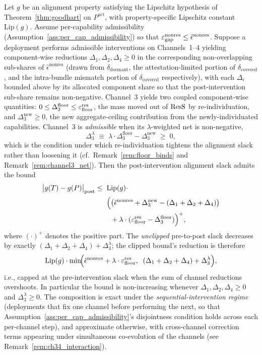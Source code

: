 \begin{proposition}
\label{prop:channel_composition}
Let $g$ be an alignment property satisfying the Lipschitz
hypothesis of Theorem~\ref{thm:goodhart} on
$P^{\mathrm{act}}$, with property-specific Lipschitz constant
$\mathrm{Lip}(g)$.  Assume per-capability admissibility
(Assumption~\ref{ass:per_cap_admissibility}) so that
$\varepsilon_{\mathrm{gap}}^{\mathrm{nonres}} \leq \hat{\epsilon}^{\mathrm{nonres}}$.  Suppose a
deployment performs admissible interventions on Channels~1--4
yielding component-wise reductions $\Delta_1, \Delta_2, \Delta_4
\geq 0$ in the corresponding non-overlapping sub-shares of
$\hat{\epsilon}^{\mathrm{nonres}}$ (drawn from
$\delta_{\mathrm{dormant}}$, the attestation-limited portion of
$\delta_{\mathrm{covered}}$, and the intra-bundle mismatch
portion of $\delta_{\mathrm{covered}}$ respectively), with each
$\Delta_i$ bounded above by its allocated component share so
that the post-intervention sub-share remains non-negative.
Channel~3 yields two coupled component-wise quantities:
$0 \leq \Delta_3^{\mathrm{floor}} \leq \varepsilon_{\mathrm{floor}}^{\mathrm{res}}$, the mass
moved out of $\mathrm{ResS}$ by re-individuation, and
$\Delta_3^{\mathrm{new}} \geq 0$, the new aggregate-ceiling
contribution from the newly-individuated capabilities.  Channel~3 is \emph{admissible} when its
$\lambda$-weighted net is non-negative,
\[
  \Delta_3^{\lambda}
  \;\equiv\; \lambda \cdot \Delta_3^{\mathrm{floor}}
              - \Delta_3^{\mathrm{new}}
  \;\geq\; 0,
\]
which is the condition under which re-individuation tightens the
alignment slack rather than loosening it (cf.\
Remark~\ref{rem:floor_binds} and
Remark~\ref{rem:channel3_net}).  Then the post-intervention
alignment slack admits the bound
\begin{align*}
  \bigl| g(T) - g(P) \bigr|_{\mathrm{post}}
  \leq\;\;& \mathrm{Lip}(g) \cdot \\
  & \Bigl(
    \bigl(\hat{\epsilon}^{\mathrm{nonres}}
       + \Delta_3^{\mathrm{new}}
       - (\Delta_1 + \Delta_2 + \Delta_4)\bigr) \\
  & \;\;{}+ \lambda \cdot (\varepsilon_{\mathrm{floor}}^{\mathrm{res}} - \Delta_3^{\mathrm{floor}})
  \Bigr)^+,
\end{align*}
where $(\cdot)^+$ denotes the positive part.  The
\emph{unclipped} pre-to-post slack decreases by exactly
$(\Delta_1 + \Delta_2 + \Delta_4) + \Delta_3^{\lambda}$;
the clipped bound's reduction is therefore
\[
  \mathrm{Lip}(g) \cdot \min\!\Bigl(
    \hat{\epsilon}^{\mathrm{nonres}}
      + \lambda \cdot \varepsilon_{\mathrm{floor}}^{\mathrm{res}},\;\;
    (\Delta_1 + \Delta_2 + \Delta_4) + \Delta_3^{\lambda}
  \Bigr),
\]
i.e., capped at the pre-intervention slack when the
sum of channel reductions overshoots.  In particular the bound
is non-increasing whenever
$\Delta_1, \Delta_2, \Delta_4 \geq 0$ and
$\Delta_3^{\lambda} \geq 0$.  The composition is exact under
the \emph{sequential-intervention regime} (deployments that
fix one channel before performing the next, so that
Assumption~\ref{ass:per_cap_admissibility}'s disjointness
condition holds across each per-channel step), and approximate
otherwise, with cross-channel correction terms appearing under
simultaneous co-evolution of the channels (see
Remark~\ref{rem:ch34_interaction}).
\end{proposition}

